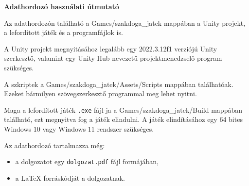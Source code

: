 \pagestyle{empty}

\noindent \textbf{\Large Adathordozó használati útmutató}

\vskip 1cm

Az adathordozón található a Games/szakdoga\_jatek mappában a Unity projekt, a lefordított játék és a programfájlok is.

A Unity projekt megnyitásához legalább egy 2022.3.12f1 verziójú Unity szerkesztő, valamint egy Unity Hub nevezetű projektmenedzselő program szükséges.

A szkriptek a Games/szakdoga\_jatek/Assets/Scripts mappában találhatóak. Ezeket bármilyen szövegszerkesztő programmal meg lehet nyitni.

Maga a lefordított játék \texttt{.exe} fájl-ja a Games/szakdoga\_jatek/Build mappában található, ezt megnyitva fog a játék elindulni. A játék elindításához egy 64 bites Windows 10 vagy Windows 11 rendszer szükséges.

Az adathordozó tartalmazza még:
\begin{itemize}
\item a dolgozatot egy \texttt{dolgozat.pdf} fájl formájában,
\item a LaTeX forráskódját a dolgozatnak.
\end{itemize}
